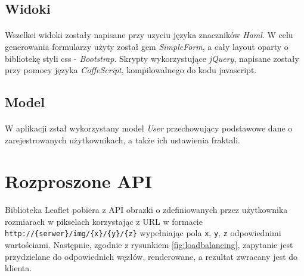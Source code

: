\documentclass[wide,a4paper,titlepage,12pt]{article}
\begin{document}
\subsection{Widoki}
\paragraph{}
Wszelkei widoki zostały napisane przy uzyciu języka znaczników \textit{Haml}. W celu generowania 
formularzy użyty został gem \textit{SimpleForm}, a cały layout oparty o bibliotekę styli 
css - \textit{Bootstrap}. Skrypty wykorzystujące \textit{jQuery}, napisane zostały przy pomocy 
języka \textit{CoffeScript}, kompilowalnego do kodu javascript.

\subsection{Model}
\paragraph{}
W aplikacji zstał wykorzystany model \textit{User} przechowujący podstawowe dane o zarejestrowanych użytkownikach,
a także ich ustawienia fraktali.

\section{Rozproszone API}
\paragraph{}
Biblioteka Leaflet pobiera z API obrazki o zdefiniowanych przez użytkownika rozmiarach w pikselach
korzystając z URL w formacie \texttt{http://\{serwer\}/img/\{x\}/\{y\}/\{z\}}
wypełniając pola \texttt{x}, \texttt{y}, \texttt{z} odpowiednimi
wartościami. Następnie, zgodnie z rysunkiem \ref{fig:loadbalancing}, zapytanie
jest przydzielane do odpowiednich węzłów, renderowane, a rezultat
zwracany jest do klienta.
\end{document}

